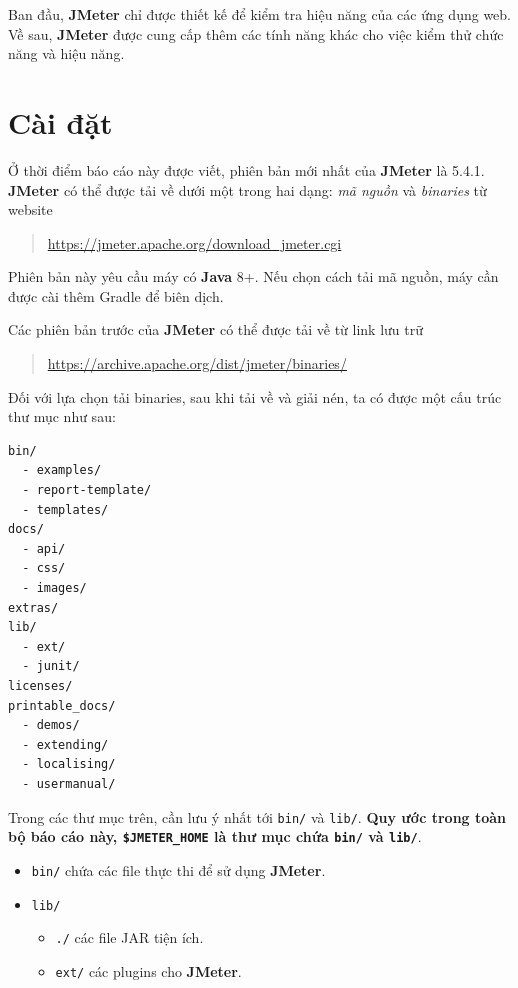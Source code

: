 \documentclass[10pt]{report}
\newcommand{\jmeter}{\textbf{JMeter}}
\newcommand{\java}{\textbf{Java}}
\newcommand{\jmeterhome}{\texttt{\$JMETER\_HOME}}
\begin{document}
\par Ban đầu, \jmeter{} chỉ được thiết kế để kiểm tra hiệu năng của các ứng dụng web. Về sau, \jmeter{} được cung cấp thêm các tính năng khác cho việc kiểm thử chức năng và hiệu năng.

\section{Cài đặt}

\par Ở thời điểm báo cáo này được viết, phiên bản mới nhất của \jmeter{} là 5.4.1. \jmeter{} có thể được tải về dưới một trong hai dạng: \textit{mã nguồn} và \textit{binaries} từ website
\begin{quotation}
  \url{https://jmeter.apache.org/download_jmeter.cgi}
\end{quotation}

\par Phiên bản này yêu cầu máy có \java{} 8+. Nếu chọn cách tải mã nguồn, máy cần được cài thêm Gradle để biên dịch.
\bigskip
\par Các phiên bản trước của \jmeter{} có thể được tải về từ link lưu trữ
\begin{quotation}
  \url{https://archive.apache.org/dist/jmeter/binaries/}
\end{quotation}

\bigskip
\par Đối với lựa chọn tải binaries, sau khi tải về và giải nén, ta có được một cấu trúc thư mục như sau:

\begin{verbatim}
bin/
  - examples/
  - report-template/
  - templates/
docs/
  - api/
  - css/
  - images/
extras/
lib/
  - ext/
  - junit/
licenses/
printable_docs/
  - demos/
  - extending/
  - localising/
  - usermanual/
\end{verbatim}

\par Trong các thư mục trên, cần lưu ý nhất tới \texttt{bin/} và \texttt{lib/}. \textbf{Quy ước trong toàn bộ báo cáo này, \jmeterhome{} là thư mục chứa \texttt{bin/} và \texttt{lib/}}.

\begin{itemize}[itemsep=0pt]
  \item \texttt{bin/} chứa các file thực thi để sử dụng \jmeter{}.
  \item \texttt{lib/}
      \begin{itemize}[itemsep=0pt]
          \item \texttt{./} các file JAR tiện ích.
          \item \texttt{ext/} các plugins cho \jmeter{}.
      \end{itemize}
\end{itemize}
\end{document}
